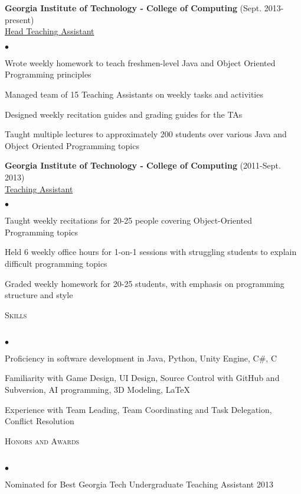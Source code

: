 \documentclass{article}
\newcommand{\lineunder}{\vspace*{-8pt} \\ \hspace*{-18pt} \hrulefill \\}
\newcommand{\header}[1]{{\hspace*{-15pt}\vspace*{6pt} \textsc{#1}} \vspace*{-6pt} \lineunder}
\newcommand{\employer}[3]{{ \textbf{#1} (#2)\\ \underline{{{#3}}}\\  }}
\newenvironment{achievements}{\begin{list}{$\bullet$}{\topsep 0pt \itemsep -2pt}}{\vspace*{4pt}\end{list}}
\begin{document}
\employer{Georgia Institute of Technology - College of Computing}{Sept. 2013-present}{Head Teaching Assistant}
    \begin{achievements}
    \item Wrote weekly homework to teach freshmen-level Java and Object Oriented Programming principles
	\item Managed team of 15 Teaching Assistants on weekly tasks and activities
	\item Designed weekly recitation guides and grading guides for the TAs
	\item Taught multiple lectures to approximately 200 students over various Java and Object Oriented Programming topics
	\end{achievements}
\employer{Georgia Institute of Technology - College of Computing}{2011-Sept. 2013}{Teaching Assistant}

	\begin{achievements}
	\item Taught weekly recitations for 20-25 people covering Object-Oriented Programming topics
	\item Held 6 weekly office hours for 1-on-1 sessions with struggling students to explain difficult programming topics
	\item Graded weekly homework for 20-25 students, with emphasis on programming structure and style
	\end{achievements}

\vspace*{18pt}
\header{Skills}
\begin{achievements}
\item Proficiency in software development in Java, Python, Unity Engine, C\#, C
\item Familiarity with Game Design, UI Design, Source Control with GitHub and Subversion, AI programming, 3D Modeling, \LaTeX
\item Experience with Team Leading, Team Coordinating and Task Delegation, Conflict Resolution
\end{achievements}

\vspace*{18pt}
\header{Honors and Awards}
\begin{achievements}
\item  Nominated for Best Georgia Tech Undergraduate Teaching Assistant 2013
\end{achievements}
\end{document}
